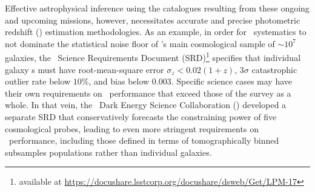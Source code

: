 Effective astrophysical inference using the catalogues resulting from these ongoing and upcoming missions, however, necessitates accurate and precise photometric redshift (\pz) estimation methodologies.
As an example, in order for \pz\ systematics to not dominate the statistical noise floor of \lsst's main cosmological sample of $\sim 10^{7}$ galaxies, the \lsst\ Science Requirements Document (SRD)\footnote{available at \url{https://docushare.lsstcorp.org/docushare/dsweb/Get/LPM-17}} specifies that individual galaxy \pz s must have root-mean-square error $\sigma_z < 0.02 (1+z)$, $3 \sigma$ catastrophic outlier rate below $10\%$, and bias below $0.003$.
Specific science cases may have their own requirements on \pz\ performance that exceed those of the survey as a whole.
In that vein, the \lsst\ Dark Energy Science Collaboration (\desc) developed a separate SRD \citep{Mandelbaum:2018} that conservatively forecasts the constraining power of five cosmological probes, leading to even more stringent requirements on \pz\ performance, including those defined in terms of tomographically binned subsamples populations rather than individual galaxies.



